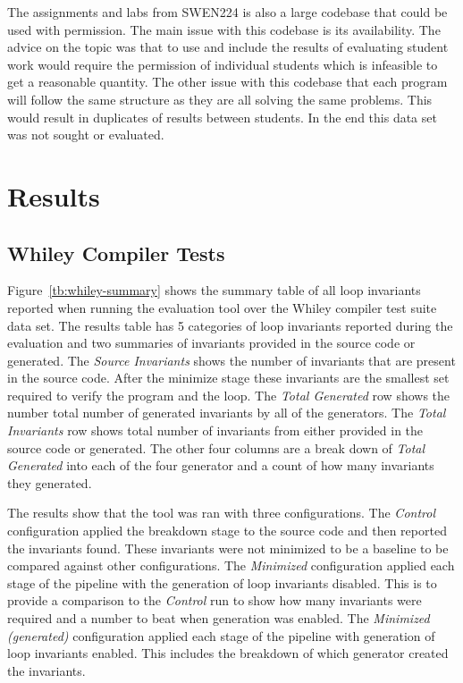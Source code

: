 The assignments and labs from SWEN224 is also a large codebase that could be
used with permission.
The main issue with this codebase is its availability.
The advice on the topic was that to use and include the results of
evaluating student work would require the permission of individual students
which is infeasible to get a reasonable quantity.
The other issue with this codebase that each program will follow the same
structure as they are all solving the same problems.
This would result in duplicates of results between students.
In the end this data set was not sought or evaluated.

\section{Results}

\subsection{Whiley Compiler Tests}

Figure~\ref{tb:whiley-summary} shows the summary table of all loop invariants
reported when running the evaluation tool over the Whiley compiler test suite data set.
The results table has 5 categories of loop invariants reported during the
evaluation and two summaries of invariants provided in the source code or generated.
The \textit{Source Invariants} shows the number of invariants that 
are present in the source code. After the minimize stage these
invariants are the smallest set required to verify the program and the loop.
The \textit{Total Generated} row shows the number total number of generated
invariants by all of the generators.
The \textit{Total Invariants} row shows total number of invariants from
either provided in the source code or generated.
The other four columns are a break down of \textit{Total Generated} 
into each of the four generator and a count of how many invariants they generated.

The results show that the tool was ran with three configurations.
The \textit{Control} configuration applied the breakdown stage to the source
code and then reported the invariants found.
These invariants were not minimized to be a baseline to be compared against
other configurations.
The \textit{Minimized} configuration applied each stage of the pipeline with
the generation of loop invariants disabled.
This is to provide a comparison to the \textit{Control} run to show how many
invariants were required and a number to beat when generation was enabled.
The \textit{Minimized (generated)} configuration applied each stage of the
pipeline with generation of loop invariants enabled.
This includes the breakdown of which generator created the invariants.


